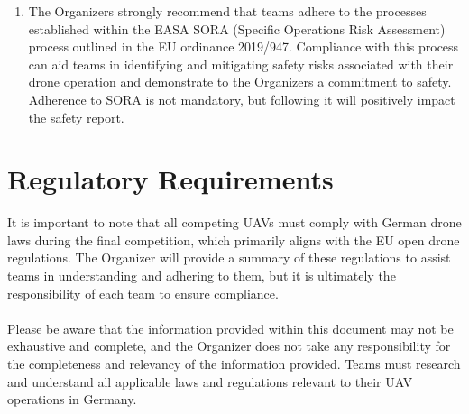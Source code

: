 \documentclass{article}
\begin{document}
\begin{enumerate}
  \item The Organizers strongly recommend that teams adhere to the processes established within the EASA SORA (Specific Operations Risk Assessment) process outlined in the EU ordinance 2019/947. Compliance with this process can aid teams in identifying and mitigating safety risks associated with their drone operation and demonstrate to the Organizers a commitment to safety. Adherence to SORA is not mandatory, but following it will positively impact the safety report.
\end{enumerate}


\section{Regulatory Requirements}
It is important to note that all competing UAVs must comply with German drone laws during the final competition, which primarily aligns with the EU open drone regulations. The Organizer will provide a summary of these regulations to assist teams in understanding and adhering to them, but it is ultimately the responsibility of each team to ensure compliance. \\ \\
Please be aware that the information provided within this document may not be exhaustive and complete, and the Organizer does not take any responsibility for the completeness and relevancy of the information provided. Teams must research and understand all applicable laws and regulations relevant to their UAV operations in Germany.
\end{document}
